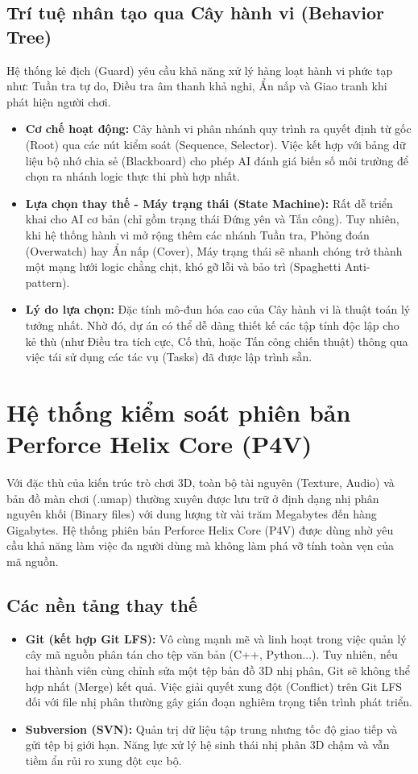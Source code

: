\documentclass[../DoAn.tex]{subfiles}
\begin{document}
\subsection{Trí tuệ nhân tạo qua Cây hành vi (Behavior Tree)}
Hệ thống kẻ địch (Guard) yêu cầu khả năng xử lý hàng loạt hành vi phức tạp như: Tuần tra tự do, Điều tra âm thanh khả nghi, Ẩn nấp và Giao tranh khi phát hiện người chơi.
\begin{itemize}
    \item \textbf{Cơ chế hoạt động:} Cây hành vi phân nhánh quy trình ra quyết định từ gốc (Root) qua các nút kiểm soát (Sequence, Selector). Việc kết hợp với bảng dữ liệu bộ nhớ chia sẻ (Blackboard) cho phép AI đánh giá biến số môi trường để chọn ra nhánh logic thực thi phù hợp nhất.
    \item \textbf{Lựa chọn thay thế - Máy trạng thái (State Machine):} Rất dễ triển khai cho AI cơ bản (chỉ gồm trạng thái Đứng yên và Tấn công). Tuy nhiên, khi hệ thống hành vi mở rộng thêm các nhánh Tuần tra, Phỏng đoán (Overwatch) hay Ẩn nấp (Cover), Máy trạng thái sẽ nhanh chóng trở thành một mạng lưới logic chằng chịt, khó gỡ lỗi và bảo trì (Spaghetti Anti-pattern).
    \item \textbf{Lý do lựa chọn:} Đặc tính mô-đun hóa cao của Cây hành vi là thuật toán lý tưởng nhất. Nhờ đó, dự án có thể dễ dàng thiết kế các tập tính độc lập cho kẻ thù (như Điều tra tích cực, Cố thủ, hoặc Tấn công chiến thuật) thông qua việc tái sử dụng các tác vụ (Tasks) đã được lập trình sẵn.
\end{itemize}

\section{Hệ thống kiểm soát phiên bản Perforce Helix Core (P4V)}
\label{section:3.2}

Với đặc thù của kiến trúc trò chơi 3D, toàn bộ tài nguyên (Texture, Audio) và bản đồ màn chơi (.umap) thường xuyên được lưu trữ ở định dạng nhị phân nguyên khối (Binary files) với dung lượng từ vài trăm Megabytes đến hàng Gigabytes. Hệ thống phiên bản Perforce Helix Core (P4V) \cite{Perforce} được dùng nhờ yêu cầu khả năng làm việc đa người dùng mà không làm phá vỡ tính toàn vẹn của mã nguồn.

\subsection{Các nền tảng thay thế}
\begin{itemize}
    \item \textbf{Git (kết hợp Git LFS):} Vô cùng mạnh mẽ và linh hoạt trong việc quản lý cây mã nguồn phân tán cho tệp văn bản (C++, Python...). Tuy nhiên, nếu hai thành viên cùng chỉnh sửa một tệp bản đồ 3D nhị phân, Git sẽ không thể hợp nhất (Merge) kết quả. Việc giải quyết xung đột (Conflict) trên Git LFS đối với file nhị phân thường gây gián đoạn nghiêm trọng tiến trình phát triển.
    \item \textbf{Subversion (SVN):} Quản trị dữ liệu tập trung nhưng tốc độ giao tiếp và gửi tệp bị giới hạn. Năng lực xử lý hệ sinh thái nhị phân 3D chậm và vẫn tiềm ẩn rủi ro xung đột cục bộ.
\end{itemize}
\end{document}
